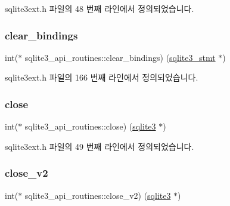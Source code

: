 sqlite3ext.\+h 파일의 48 번째 라인에서 정의되었습니다.

\mbox{\label{structsqlite3__api__routines_a029f84e8bb05f0274c728b45668871b5}} 
\subsubsection{\texorpdfstring{clear\+\_\+bindings}{clear\_bindings}}
{\footnotesize\ttfamily int($\ast$ sqlite3\+\_\+api\+\_\+routines\+::clear\+\_\+bindings) (\hyperlink{sqlite3_8h_af2a033da1327cdd77f0a174a09aedd0c}{sqlite3\+\_\+stmt} $\ast$)}



sqlite3ext.\+h 파일의 166 번째 라인에서 정의되었습니다.

\mbox{\label{structsqlite3__api__routines_a5c30292eef0130d7e8a408c4e3396012}} 
\subsubsection{\texorpdfstring{close}{close}}
{\footnotesize\ttfamily int($\ast$ sqlite3\+\_\+api\+\_\+routines\+::close) (\hyperlink{sqlite3_8h_a0ef6f2646262c8a9b24368d8ac140f69}{sqlite3} $\ast$)}



sqlite3ext.\+h 파일의 49 번째 라인에서 정의되었습니다.

\mbox{\label{structsqlite3__api__routines_abb98b8486cbe7d739b8840d3d90baa30}} 
\subsubsection{\texorpdfstring{close\+\_\+v2}{close\_v2}}
{\footnotesize\ttfamily int($\ast$ sqlite3\+\_\+api\+\_\+routines\+::close\+\_\+v2) (\hyperlink{sqlite3_8h_a0ef6f2646262c8a9b24368d8ac140f69}{sqlite3} $\ast$)}



